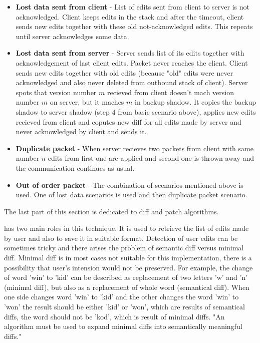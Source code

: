 \documentclass[12pt,oneside]{fithesis2}
\begin{document}
\begin{itemize}
\item \textbf{Lost data sent from client} - List of edits sent from client to server is not acknowledged. Client keeps edits in the stack and after the timeout, client sends new edits together with these old not-acknowledged edits. This repeats until server acknowledges some data.
\item \textbf{Lost data sent from server} - Server sends list of its edits together with acknowledgement of last client edits. Packet never reaches the client. Client sends new edits together with old edits (because "old" edits were never acknowledged and also never deleted from outbound stack of client). Server spots that version number \(m\) recieved from client doesn't mach version number \(m\) on server, but it maches \(m\) in backup shadow. It copies the backup shadow to server shadow (step 4 from basic scenario above), applies new edits recieved from client and coputes new diff for all edits made by server and never acknowledged by client and sends it.
\item \textbf{Duplicate packet} - When server recieves two packets from client with same number \(n\) edits from first one are applied and second one is thrown away and the communication continues as usual.
\item \textbf{Out of order packet} - The combination of scenarios mentioned above is used. One of lost data scenarios is used and then duplicate packet scenario.\cite{Fraser} 
\end{itemize}
\par The last part of this section is dedicated to diff and patch algorithms. 
\par \underline{} has two main roles in this technique. It is used to retrieve the list of edits made by user and also to save it in suitable format. Detection of user edits can be sometimes tricky and there arises the problem of semantic diff versus minimal diff. Minimal diff is in most cases not suitable for this implementation, there is a possibility that user's intension would not be preserved. For example, the change of word 'win' to 'kid' can be described as replacement of two letters 'w' and 'n' (minimal diff), but also as a replacement of whole word (semantical diff). When one side changes word 'win' to 'kid' and the other changes the word 'win' to 'won' the result should be either 'kid' or 'won', which are results of semantical diffs, the word should not be 'kod', which is result of minimal diffs. "An algorithm must be used to expand minimal diffs into semantically meaningful diffs." \cite{Fraser}
\end{document}
